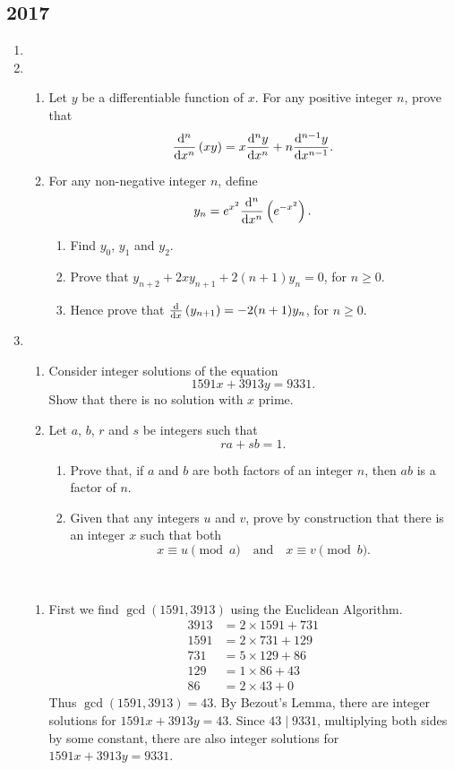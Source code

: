 \subsection*{2017}
\begin{enumerate}
\item 
\item \begin{enumerate}[label=(\roman*)]
\item Let $y$ be a differentiable function of $x$. For any positive integer $n$, prove that
\[ \dv[n]{}{x}\left(xy\right)=x\dv[n]{y}{x}+n\dv[n-1]{y}{x}. \]
\item For any non-negative integer $n$, define
\[ y_n=e^{x^2}\dv[n]{}{x}\left(e^{-x^2}\right). \]
\begin{enumerate}[label=(\alph*)]
    \item Find $y_0$, $y_1$ and $y_2$.
    \item Prove that $y_{n+2}+2xy_{n+1}+2(n+1)y_n=0$, for $n\ge0$.
    \item Hence prove that $\dv{}{x}\left(y_{n+1}\right)=-2(n+1)y_n$, for $n\ge0$.
\end{enumerate}
\end{enumerate}

\item \begin{enumerate}[label=(\alph*)]
\item Consider integer solutions of the equation
\[ 1591x+3913y=9331. \]
Show that there is no solution with $x$ prime.

\item Let $a$, $b$, $r$ and $s$ be integers such that 
\[ ra+sb=1. \]
    \begin{enumerate}[label=(\roman*)]
    \item Prove that, if $a$ and $b$ are both factors of an integer $n$, then $ab$ is a factor of $n$.
    \item Given that any integers $u$ and $v$, prove by construction that there is an integer $x$ such that both
    \[ x\equiv u\pmod a \quad \text{and} \quad x\equiv v\pmod b. \]
    \end{enumerate}
\end{enumerate}

\begin{solution} \
\begin{enumerate}[label=(\alph*)]
\item First we find $\gcd(1591,3913)$ using the Euclidean Algorithm.
\begin{align*}
3913 &= 2\times1591+731 \\
1591 &= 2\times731+129 \\
731 &= 5\times129+86 \\
129 &= 1\times86+43 \\
86 &= 2\times43+0
\end{align*}
Thus $\gcd(1591,3913)=43$. By Bezout's Lemma, there are integer solutions for $1591x+3913y=43$. Since $43\mid9331$, multiplying both sides by some constant, there are also integer solutions for $1591x+3913y=9331$.


\end{enumerate}
\end{solution}
\end{enumerate}
